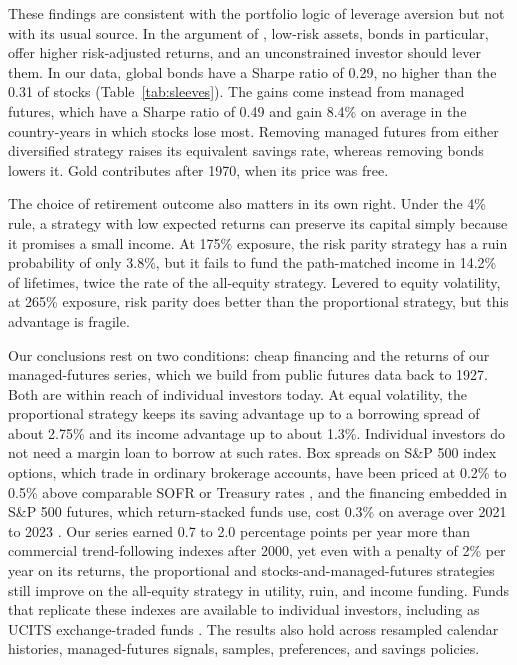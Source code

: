 \documentclass[12pt]{article}
\begin{document}
These findings are consistent with the portfolio logic of leverage aversion but not with its usual
source. In the argument of \citet{AsnessFrazziniPedersen2012}, low-risk assets, bonds in particular,
offer higher risk-adjusted returns, and an unconstrained investor should lever them. In our data, global
bonds have a Sharpe ratio of 0.29, no higher than the 0.31 of stocks (Table~\ref{tab:sleeves}). The gains
come instead from managed futures, which have a Sharpe ratio of 0.49 and gain 8.4\% on average in the
country-years in which stocks lose most. Removing managed futures from either diversified strategy raises
its equivalent savings rate, whereas removing bonds lowers it. Gold contributes after 1970, when its
price was free.

The choice of retirement outcome also matters in its own right. Under the 4\% rule, a strategy with low
expected returns can preserve its capital simply because it promises a small income. At 175\% exposure,
the risk parity strategy has a ruin probability of only 3.8\%, but it fails to fund the path-matched
income in 14.2\% of lifetimes, twice the rate of the all-equity strategy. Levered to equity volatility,
at 265\% exposure, risk parity does better than the proportional strategy, but this advantage is
fragile.

Our conclusions rest on two conditions: cheap financing and the returns of our managed-futures series,
which we build from public futures data back to 1927. Both are within reach of individual investors today.
At equal volatility, the proportional strategy keeps its saving advantage up to a borrowing spread of about
2.75\% and its income advantage up to about 1.3\%. Individual investors do not need a margin loan to borrow at such rates. Box spreads on S\&P 500 index
options, which trade in ordinary brokerage accounts, have been priced at 0.2\% to 0.5\% above comparable
SOFR or Treasury rates \citep{CMEBoxFinancing2024,WangBoxFinancing2025},
and the financing embedded in S\&P 500 futures, which return-stacked funds use, cost 0.3\% on average over
2021 to 2023 \citep{DEShaw2025}. Our series earned 0.7 to 2.0 percentage points per year more than
commercial trend-following indexes after 2000, yet even with a penalty of 2\% per year on its returns, the
proportional and stocks-and-managed-futures strategies still improve on the all-equity strategy in
utility, ruin, and income funding. Funds that replicate these indexes are available to individual
investors, including as UCITS exchange-traded funds \citep{iMGPDBMF2025}. The results also hold across
resampled calendar histories, managed-futures signals, samples, preferences, and savings policies.
\end{document}

